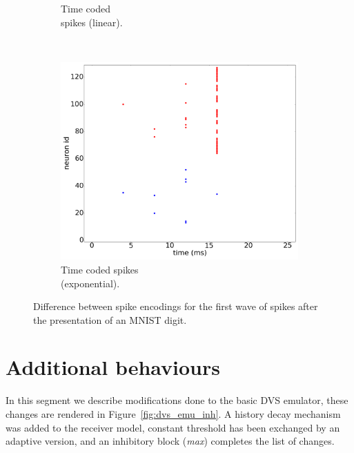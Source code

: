 \documentclass[conference]{IEEEtran}
\begin{document}
\begin{figure}[hbt]
\begin{subfigure}[b]{0.31\textwidth}
    \caption{Time coded\\spikes (linear).}
    \label{fig:time_spikes}
  \end{subfigure}~
  \begin{subfigure}[b]{0.31\textwidth}
    \includegraphics[width=\textwidth]{time_exp_coded_-8x8-_cycle_0}
    \caption{Time coded spikes \\(exponential).}
    \label{fig:time_exp_spikes}
  \end{subfigure}
  
  \caption{Difference between spike encodings for the first wave of spikes after the presentation of an MNIST digit.}
  \label{fig:spike_codes}
\end{figure}

\section{Additional behaviours}
\label{sec:additional-behaviours}
In this segment we describe modifications done to the basic DVS emulator, these changes are rendered in Figure~\ref{fig:dvs_emu_inh}. A history decay mechanism was added to the receiver model, constant threshold has been exchanged by an adaptive version, and an inhibitory block (\textit{\textsf{max}}) completes the list of changes.
\end{document}
